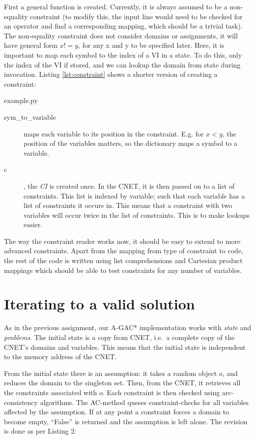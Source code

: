 \documentclass[journal]{IEEEtran}
\begin{document}
First a general function is created. Currently, it is always assumed
to be a non-equality constraint (to modify this, the input line would need
to be checked for an operator and find a corresponding mapping, which should
be a trivial task). The non-equality constraint does not consider domains
or assignments, it will have general form $x != y$, for any x and y to
be specified later. Here, it is important to map each symbol
to the index of a VI in a state. To do this, only the index of the VI
if stored, and we can lookup the domain from state during invocation. Listing \autoref{lst:constraint}
shows a shorter version of creating a constraint:
\begin{lstinputlisting}[caption="Creation of constraint",language=Python]{example.py}
    \label{lst:constraint}
\end{lstinputlisting}

\begin{description}
    \item[sym\_to\_variable] maps each variable to its position in the
        constraint. E.g. for $x < y$, the position of the variables matters, so the 
        dictionary maps a symbol to a variable.
    \item[c], the \textit{CI} is created once. In the CNET, it is then passed
        on to a list of constraints. This list is indexed by variable;
        such that each variable has a list of constraints it occurs in.
        This means that a constraint with two variables will occur
        twice in the list of constraints. This is to make lookups easier.
\end{description}

The way the constraint reader works now, it should be easy to extend
to more advanced constraints. Apart from the mapping from type of constraint
to code, the rest of the code is written using list comprehensions and Cartesian
product mappings which should be able to test constraints for any number
of variables.

\section{Iterating to a valid solution}
As in the previous assignment, our A-GAC* implementation works with \textit{state} and 
\textit{problems}. The initial state is a copy from CNET, i.e.\ a complete
copy of the CNET's domains and variables. This means that the initial state
is independent to the memory address of the CNET.

From the initial state there is an assumption: it takes a random object $o$, and reduces
the domain to the singleton set. Then, from the CNET, 
it retrieves all the constraints associated with $o$. Each constraint is
then checked using arc-consistency algorithms. The AC-method 
queses constraint-checks for all variables affected by the assumption.
If at any point a constraint forces a domain to become empty, ``False''
is returned and the assumption is left alone.
The revision is done as per Listing 2:
\end{document}

